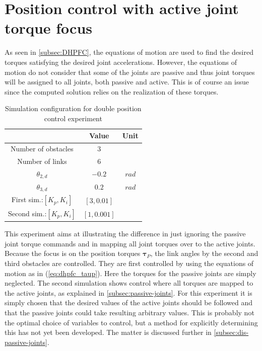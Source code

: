 \section{Position control with active joint torque focus}\label{sec:pas-pos}

As seen in \ref{subsec:DHPFC}, the equations of motion are used to find the desired torques satisfying the desired joint accelerations. However, the equations of motion do not consider that some of the joints are passive and thus joint torques will be assigned to all joints, both passive and active. This is of course an issue since the computed solution relies on the realization of these torques.

\begin{table}[H]
    \centering
    \begin{tabular}{|c|c|c|}
        \hline
        & \textbf{Value} & \textbf{Unit}\\
        \hline \hline
        Number of obstacles & $3$ & \\
        Number of links & $6$ & \\
        $\theta_{2,d}$ & $-0.2$ & $rad$ \\
        $\theta_{3,d}$ & $0.2$ & $rad$ \\
        First sim.:$[K_{p}, K_{i}]$ & $[3, 0.01]$ &\\
        Second sim.:$[K_{p}, K_{i}]$ & $[1, 0.001]$ &\\
        \hline
    \end{tabular}
    \caption{Simulation configuration for double position control experiment}
    \label{tab:exp_2xp}
\end{table}

This experiment aims at illustrating the difference in just ignoring the passive joint torque commands and in mapping all joint torques over to the active joints. Because the focus is on the position torques $\boldsymbol{\tau}_P$, the link angles by the second and third obstacles are controlled. They are first controlled by using the equations of motion as in (\ref{eq:dhpfc_taup}). Here the torques for the passive joints are simply neglected. The second simulation shows control where all torques are mapped to the active joints, as explained in \ref{subsec:passive-joints}. For this experiment it is simply chosen that the desired values of the active joints should be followed and that the passive joints could take resulting arbitrary values. This is probably not the optimal choice of variables to control, but a method for explicitly determining this has not yet been developed. The matter is discussed further in \ref{subsec:dis-passive-joints}.

